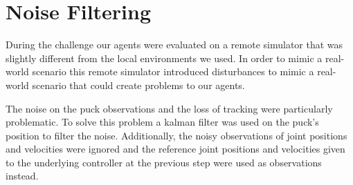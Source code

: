\section{Noise Filtering}
\label{sec:noise_filtering}

During the challenge our agents were evaluated on a remote simulator that was slightly different from the local environments we used.
In order to mimic a real-world scenario this remote simulator introduced disturbances to mimic a real-world scenario that could create problems to our agents.

The noise on the puck observations and the loss of tracking were particularly problematic.
To solve this problem a  kalman filter \cite{kalman_filter} was used on the puck's position to filter the noise.
Additionally, the noisy observations of joint positions and velocities were ignored and the reference joint positions and velocities given to the underlying
controller at the previous step were used as observations instead.